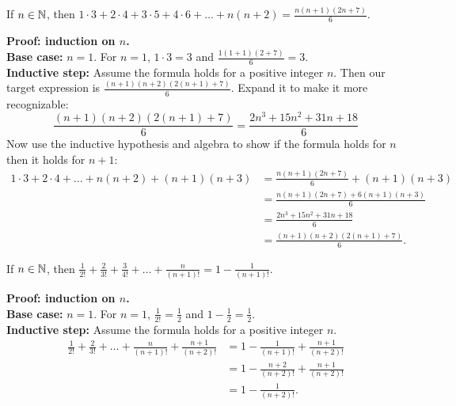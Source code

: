\documentclass{article}
\begin{document}
\begin{problem}
If $n \in \mathbb{N}$, then $1\cdot 3 + 2\cdot 4 + 3\cdot 5 + 4\cdot 6 + \ldots + n(n+2) = \frac{n(n+1)(2n+7)}{6}$.
\end{problem}
\textbf{Proof: induction on $n$.}
\\

\textbf{Base case:} $n = 1$. For $n = 1$, $1\cdot 3 = 3$ and $\frac{1(1+1)(2+7)}{6} = 3$.
\\

\textbf{Inductive step:} Assume the formula holds for a positive integer $n$. Then our target expression is $\frac{(n+1)(n+2)(2(n+1)+7)}{6}$. Expand it to make it more recognizable:
$$\frac{(n+1)(n+2)(2(n+1) + 7)}{6} = \frac{2n^3 + 15n^2 + 31n + 18}{6}$$
Now use the inductive hypothesis and algebra to show if the formula holds for $n$ then it holds for $n+1$:
\begin{align*}
    1\cdot 3 + 2\cdot 4 + \ldots + n(n+2) + (n+1)(n+3) & = \frac{n(n+1)(2n+7)}{6} + (n+1)(n+3)  \\
                                                       & = \frac{n(n+1)(2n+7) + 6(n+1)(n+3)}{6} \\
                                                       & = \frac{2n^3 + 15n^2 + 31n + 18}{6}    \\
                                                       & = \frac{(n+1)(n+2)(2(n+1) + 7)}{6}.
\end{align*}

\begin{problem}
If $n \in \mathbb{N}$, then $\frac{1}{2!} + \frac{2}{3!} + \frac{3}{4!} + \ldots + \frac{n}{(n+1)!} = 1 - \frac{1}{(n+1)!}$.
\end{problem}

\textbf{Proof: induction on $n$.}
\\

\textbf{Base case:} $n = 1$. For $n = 1$, $\frac{1}{2!} = \frac{1}{2}$ and $1 - \frac{1}{2} = \frac{1}{2}$.
\\

\textbf{Inductive step:} Assume the formula holds for a positive integer $n$.
\begin{align*}
    \frac{1}{2!} + \frac{2}{3!} + \ldots + \frac{n}{(n+1)!} + \frac{n+1}{(n+2)!} & = 1 - \frac{1}{(n+1)!} + \frac{n+1}{(n+2)!}   \\
                                                                                 & = 1 - \frac{n+2}{(n+2)!} + \frac{n+1}{(n+2)!} \\
                                                                                 & = 1 - \frac{1}{(n+2)!}.
\end{align*}
\end{document}
